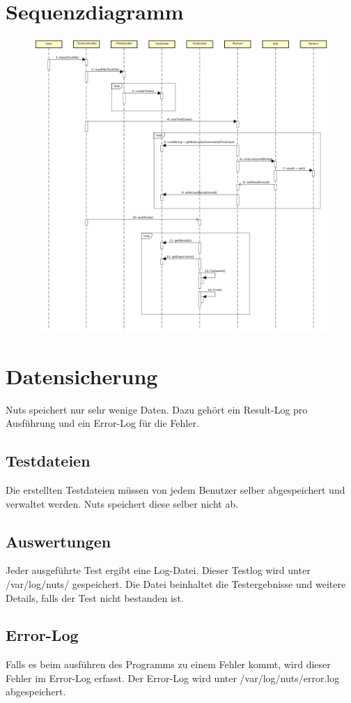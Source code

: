 \documentclass[a4,12pt]{scrartcl}
\begin{document}
\section{Sequenzdiagramm}
\begin{figure} [H]
	\begin{center}
	\includegraphics[width=1\textwidth]{./pictures/SequenceDiagram.png}
	\label{Bild Referenz}
	\end{center}
\end{figure}

\section{Datensicherung}
Nuts speichert nur sehr wenige Daten. Dazu gehört ein Result-Log pro Ausführung und ein Error-Log für die Fehler.
\subsection{Testdateien}
Die erstellten Testdateien müssen von jedem Benutzer selber abgespeichert und verwaltet werden. Nuts speichert diese selber nicht ab.
\subsection{Auswertungen}
Jeder ausgeführte Test ergibt eine Log-Datei. Dieser Testlog wird unter /var/log/nuts/ gespeichert. Die Datei beinhaltet die Testergebnisse und weitere Details, falls der Test nicht bestanden ist.
\subsection{Error-Log}
Falls es beim ausführen des Programms zu einem Fehler kommt, wird dieser Fehler im Error-Log erfasst. Der Error-Log wird unter /var/log/nuts/error.log abgespeichert.
\end{document}
